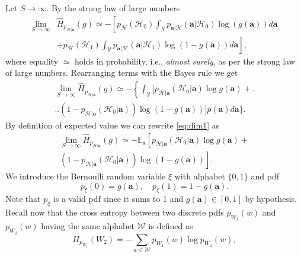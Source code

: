 \documentclass[conference,final]{IEEEtran}
\newcommand{\cross}[2]{H_{#1}(#2)}
\newcommand{\hatcross}[2]{\hat{H}_{#1}(#2)}
\newcommand{\gy}{g(\bm a)}
\begin{document}
\begin{appendices}
Let $S \to \infty$. By the strong law of large numbers%
\begin{equation}
\label{eq:as}
\begin{split}
	\lim_{S \to \infty}&	\hatcross{ p_{\mathcal{H}|\bm a}}{g} \simeq - \left[ p_{\mathcal H}(\mathcal{H}_0) \int_{\mathcal{Y}} p_{\bm a|\mathcal{H}}(\bm a|\mathcal{H}_0) \log (\gy) d\bm a \right. \\
	& \left. + p_{\mathcal{H}}(\mathcal{H}_1) \int_{\mathcal{Y}} p_{\bm a|\mathcal{H}}(\bm a|\mathcal{H}_1) \log (1-\gy) d\bm a \right],
\end{split}
\end{equation}
where equality $\simeq$ holds in probability, i.e., \textit{almost surely}, as per the strong law of large numbers.
Rearranging terms with the Bayes rule we get
\begin{equation}
\label{eq:dim1}
\begin{split}
\lim_{S \to \infty}	\hatcross{p_{\mathcal{H}|\bm a}}{g} \simeq - \left\{ \int_{\mathcal{Y}} \bigl[ p_{\mathcal{H}|\bm a}(\mathcal{H}_0|\bm a) \log \gy + \right. \bigr.\\ 
	\bigl. \bigl.(1-p_{\mathcal{H}|\bm a}(\mathcal{H}_0|\bm a)) \log(1-\gy)\bigr] p(\bm a)   d\bm a \biggr\}. 		
\end{split}
\end{equation}
By definition of expected value we can rewrite \eqref{eq:dim1} as
\begin{equation}
		\label{eq:dim2}
		\begin{split}
	\lim_{S \to \infty}	\hatcross{p_{\mathcal{H}|\bm a}}{g} \simeq - \mathbb{E}_{\bm a} \left[ p_{\mathcal{H}|\bm a}(\mathcal{H}_0|\bm a) \log \gy + \right.\\ 
			\left. (1-p_{\mathcal{H}|\bm a}(\mathcal{H}_0|\bm a)) \log(1-\gy)\right].  		
		\end{split}
\end{equation}
We introduce the Bernoulli random variable $\xi$ with alphabet $ \{0,1\}$ and \ac{pdf} 
\begin{equation}
\label{eq:q}
p_\xi(0) = \gy, \quad
p_\xi(1) = 1- \gy.
\end{equation}
Note that $p_\xi$ is a valid \ac{pdf} since it sums to 1 and $\gy \in [0,1]$ by hypothesis.
Recall now that the cross entropy between two discrete \acp{pdf} $p_{W_1}(w)$ and $p_{W_2}(w)$ having the same alphabet $\mathcal{W}$ is defined as
\begin{equation}
\label{eq:defCross}
	\cross{p_{W_1}}{W_2} = - \sum_{w \in \mathcal{W}} p_{W_1}(w) \log p_{W_2}(w),

\end{equation}
\end{appendices}
\end{document}
